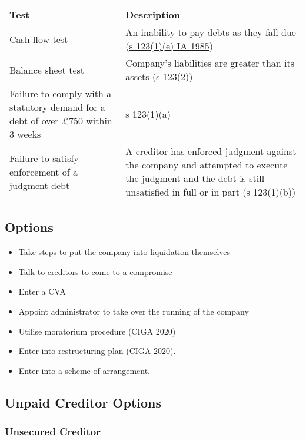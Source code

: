 \documentclass[
]{article}
\providecommand{\tightlist}{%
  \setlength{\itemsep}{0pt}\setlength{\parskip}{0pt}}
\begin{document}
\begin{longtable}[]{@{}ll@{}}
\toprule()
Test & Description \\
\midrule()
\endhead
Cash flow test & An inability to pay debts as they fall due
(\href{https://www.legislation.gov.uk/ukpga/1986/45/section/123}{s
123(1)(e) IA 1985}) \\
Balance sheet test & Company's liabilities are greater than its assets
(s 123(2)) \\
Failure to comply with a statutory demand for a debt of over £750 within
3 weeks & s 123(1)(a) \\
Failure to satisfy enforcement of a judgment debt & A creditor has
enforced judgment against the company and attempted to execute the
judgment and the debt is still unsatisfied in full or in part (s
123(1)(b)) \\
\bottomrule()
\end{longtable}

\hypertarget{options}{%
\subsection{Options}\label{options}}

\begin{itemize}
\tightlist
\item
  Take steps to put the company into liquidation themselves
\item
  Talk to creditors to come to a compromise
\item
  Enter a CVA
\item
  Appoint administrator to take over the running of the company
\item
  Utilise moratorium procedure (CIGA 2020)
\item
  Enter into restructuring plan (CIGA 2020).
\item
  Enter into a scheme of arrangement.
\end{itemize}

\hypertarget{unpaid-creditor-options}{%
\subsection{Unpaid Creditor Options}\label{unpaid-creditor-options}}

\hypertarget{unsecured-creditor}{%
\subsubsection{Unsecured Creditor}\label{unsecured-creditor}}
\end{document}
